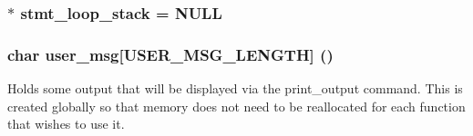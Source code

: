 \subsubsection{$\ast$ stmt\_\-loop\_\-stack = NULL}\label{statement_8c_a0}


\subsubsection{\setlength{\rightskip}{0pt plus 5cm}char user\_\-msg[USER\_\-MSG\_\-LENGTH] ()}\label{statement_8c_a1}


Holds some output that will be displayed via the print\_\-output command. This is created globally so that memory does not need to be reallocated for each function that wishes to use it. 